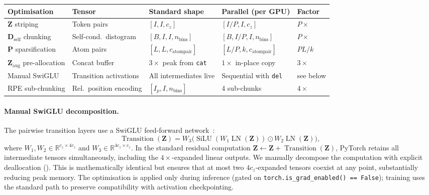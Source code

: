 \documentclass{article}
\theoremstyle{plain}
\theoremstyle{definition}
\theoremstyle{remark}
\begin{document}
\begin{center}
\small
\begin{tabular}{@{}lllll@{}}
\toprule
\textbf{Optimisation} & \textbf{Tensor} & \textbf{Standard shape} & \textbf{Parallel (per GPU)} & \textbf{Factor} \\
\midrule
$\mathbf{Z}$ striping
  & Token pairs
  & $[I, I, c_z]$
  & $[I/P, I, c_z]$
  & $P\times$ \\
$\mathbf{D}_\text{self}$ chunking
  & Self-cond.\ distogram
  & $[B, I, I, n_\text{bins}]$
  & $[B, I/P, I, n_\text{bins}]$
  & $P\times$ \\
$\mathbf{P}$ sparsification
  & Atom pairs
  & $[L, L, c_\text{atompair}]$
  & $[L/P, k, c_\text{atompair}]$
  & $PL/k$ \\
$\mathbf{Z}_\text{aug}$ pre-allocation
  & Concat buffer
  & $3{\times}$ peak from \texttt{cat}
  & $1{\times}$ in-place copy
  & $3\times$ \\
Manual SwiGLU
  & Transition activations
  & All intermediates live
  & Sequential with \texttt{del}
  & see below \\
RPE sub-chunking
  & Rel.\ position encoding
  & $[I_p, I, n_\text{bins}]$
  & 4 sub-chunks
  & $4\times$ \\
\bottomrule
\end{tabular}
\label{tab:memory-1d}
\end{center}

\paragraph{Manual SwiGLU decomposition.}
\label{app:swiglu}
The pairwise transition layers use a SwiGLU feed-forward network~\cite{shazeer2020glu}:
\begin{equation}
\operatorname{Transition}(\mathbf{Z}) =
  W_3 \bigl(\operatorname{SiLU}(W_1 \operatorname{LN}(\mathbf{Z}))
  \odot W_2 \operatorname{LN}(\mathbf{Z})\bigr),
\end{equation}
where $W_1, W_2 \in \mathbb{R}^{c_z \times 4c_z}$ and $W_3 \in \mathbb{R}^{4c_z \times c_z}$. In the standard residual computation $\mathbf{Z} \leftarrow \mathbf{Z} + \operatorname{Transition}(\mathbf{Z})$, PyTorch retains all intermediate tensors simultaneously, including the $4{\times}$-expanded linear outputs. We manually decompose the computation with explicit deallocation (). This is mathematically identical but ensures that at most two $4c_z$-expanded tensors coexist at any point, substantially reducing peak memory. The optimisation is applied only during inference (gated on \texttt{torch.is\_grad\_enabled() == False}); training uses the standard path to preserve compatibility with activation checkpointing.
\end{document}
